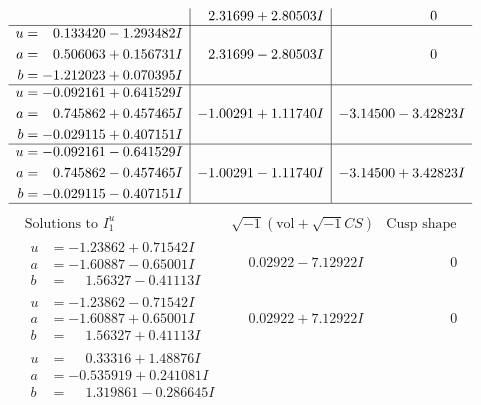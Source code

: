 \documentclass[1p]{elsarticle_modified}
\theoremstyle{definition}
\newcommand{\I}{\sqrt{-1}}
\begin{document}
$$\begin{array}{c|c|c}
 & \phantom{-}2.31699 + 2.80503 I & \phantom{-0.000000 } 0 \\ \hline\begin{aligned}
u &= \phantom{-}0.133420 - 1.293482 I \\
a &= \phantom{-}0.506063 + 0.156731 I \\
b &= -1.212023 + 0.070395 I\end{aligned}
 & \phantom{-}2.31699 - 2.80503 I & \phantom{-0.000000 } 0 \\ \hline\begin{aligned}
u &= -0.092161 + 0.641529 I \\
a &= \phantom{-}0.745862 + 0.457465 I \\
b &= -0.029115 + 0.407151 I\end{aligned}
 & -1.00291 + 1.11740 I & -3.14500 - 3.42823 I \\ \hline\begin{aligned}
u &= -0.092161 - 0.641529 I \\
a &= \phantom{-}0.745862 - 0.457465 I \\
b &= -0.029115 - 0.407151 I\end{aligned}
 & -1.00291 - 1.11740 I & -3.14500 + 3.42823 I\\
 \hline 
 \end{array}$$\newpage$$\begin{array}{c|c|c}  
\text{Solutions to }I^u_{1}& \I (\text{vol} + \sqrt{-1}CS) & \text{Cusp shape}\\
 \hline 
\begin{aligned}
u &= -1.23862 + 0.71542 I \\
a &= -1.60887 - 0.65001 I \\
b &= \phantom{-}1.56327 - 0.41113 I\end{aligned}
 & \phantom{-}0.02922 - 7.12922 I & \phantom{-0.000000 } 0 \\ \hline\begin{aligned}
u &= -1.23862 - 0.71542 I \\
a &= -1.60887 + 0.65001 I \\
b &= \phantom{-}1.56327 + 0.41113 I\end{aligned}
 & \phantom{-}0.02922 + 7.12922 I & \phantom{-0.000000 } 0 \\ \hline\begin{aligned}
u &= \phantom{-}0.33316 + 1.48876 I \\
a &= -0.535919 + 0.241081 I \\
b &= \phantom{-}1.319861 - 0.286645 I\end{aligned}

\end{array}$$
\end{document}

